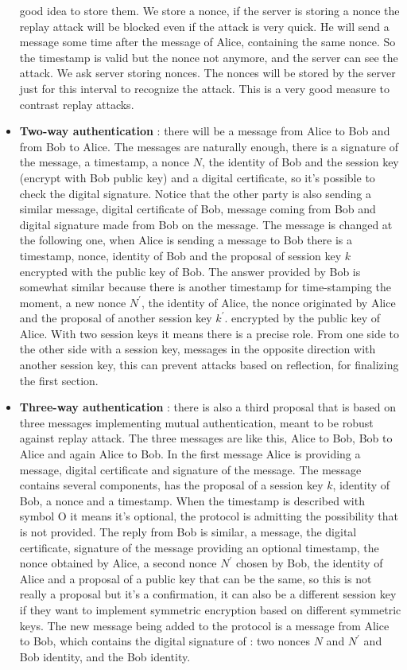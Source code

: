 \documentclass[11pt]{article}
\begin{document}
\begin{itemize}
good idea to store them. We store a nonce, if the server is storing a nonce the replay attack will be blocked even if the attack is very quick. He will send a message some time after the message of Alice, containing the same nonce. So the timestamp is valid but the nonce not anymore, and the server can see the attack. We ask server storing nonces. The nonces will be stored by the server just for this interval to recognize the attack. This is a very good measure to contrast replay attacks.
\item \textbf{Two-way authentication} : there will be a message from Alice to Bob and from Bob to Alice. The messages are naturally enough, there is a signature of the message, a timestamp, a nonce $N$, the identity of Bob and the session key (encrypt with Bob public key) and a digital certificate, so it's possible to check the digital signature. Notice that the other party is also sending a similar message, digital certificate of Bob, message coming from Bob and digital signature made from Bob on the message. The message is changed at the following one, when Alice is sending a message to Bob there is a timestamp, nonce, identity of Bob and the proposal of session key $k$ encrypted with the public key of Bob. The answer provided by Bob is somewhat similar because there is another timestamp for time-stamping the moment, a new nonce $N^{'}$, the identity of Alice, the nonce originated by Alice and the proposal of another session key $k^{'}$. encrypted by the public key of Alice. With two session keys it means there is a precise role. From one side to the other side with a session
key, messages in the opposite direction with another session key, this can prevent attacks based on reflection, for finalizing the first section.
\item \textbf{Three-way authentication} : there is also a third proposal that is based on three messages implementing mutual authentication, meant to be robust against replay attack. The three messages are like this, Alice to Bob, Bob to Alice and again Alice to Bob. In the first message Alice is providing a message, digital certificate and signature of the
message. The message contains several components, has the proposal of a session key $k$, identity of Bob, a nonce and a timestamp. When the timestamp is described with symbol O it means it's optional, the protocol is admitting the possibility that is not provided. The reply from Bob is similar, a message, the digital certificate, signature of the
message providing an optional timestamp, the nonce obtained by Alice, a second nonce $N^{'}$ chosen by Bob, the identity of Alice and a proposal of a public key that can be the same, so this is not really a proposal but it's a confirmation, it can also be a different session key if they want to implement symmetric encryption based on different symmetric keys. The new message being added to the protocol is a message from Alice to Bob, which contains the digital signature of : two nonces $N$ and $N^{'}$ and Bob identity, and the Bob identity.
\end{itemize}
\end{document}
